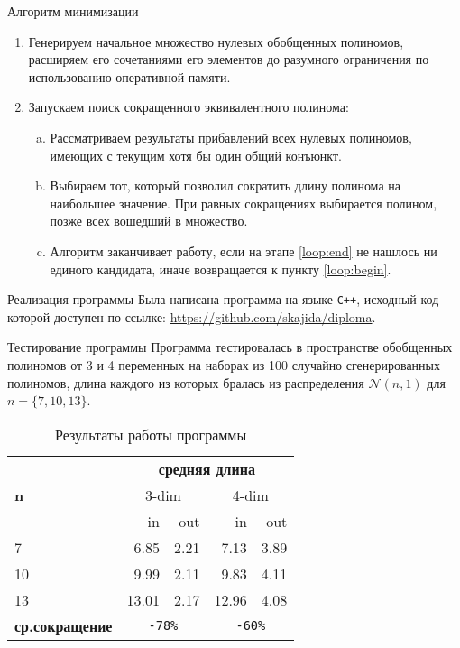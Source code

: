 \documentclass{beamer}
\begin{document}
\begin{frame}{Алгоритм минимизации}

\begin{enumerate}
    \item Генерируем начальное множество нулевых обобщенных полиномов, расширяем его сочетаниями его элементов до разумного ограничения по использованию оперативной памяти.
    \item Запускаем поиск сокращенного эквивалентного полинома:
    \begin{enumerate}[a.]
        \item \label{loop:begin} Рассматриваем результаты прибавлений всех нулевых полиномов, имеющих с текущим хотя бы один общий конъюнкт.
        \item \label{loop:end} Выбираем тот, который позволил сократить длину полинома на наибольшее значение. При равных сокращениях выбирается полином, позже всех вошедший в множество.
        \item Алгоритм заканчивает работу, если на этапе \ref{loop:end} не нашлось ни единого кандидата, иначе возвращается к пункту \ref{loop:begin}.
    \end{enumerate}
\end{enumerate}

\end{frame}

\begin{frame}{Реализация программы}
Была написана программа на языке \texttt{C++}, исходный код которой доступен по ссылке: \url{https://github.com/skajida/diploma}.
\end{frame}

\begin{frame}{Тестирование программы}
Программа тестировалась в пространстве обобщенных полиномов от 3 и 4 переменных на наборах из 100 случайно сгенерированных полиномов, длина каждого из которых бралась из распределения $ \mathcal{N} (n, 1) $ для $ n = \{ 7, 10, 13 \} $.

\begin{table}
\caption{Результаты работы программы}
\label{table_results}
\centering
\begin{tabular}{ |l||r|r||r|r| } \hline
\multirow{3}{*}{\bf n} & \multicolumn{4}{c|}{\bf средняя длина} \\ \cline{2-5}
    & \multicolumn{2}{c||}{3-dim} & \multicolumn{2}{c|}{4-dim} \\ \cline{2-5}
    & in    & out  & in    & out  \\ \hline \hline
7   & 6.85  & 2.21 & 7.13  & 3.89 \\ \hline
10  & 9.99  & 2.11 & 9.83  & 4.11 \\ \hline
13  & 13.01 & 2.17 & 12.96 & 4.08 \\ \hline \hline
\textbf{ср.сокращение} & \multicolumn{2}{c||}{\tt -78\%} & \multicolumn{2}{c|}{\tt -60\%} \\ \hline
\end{tabular}
\end{table}

\end{frame}
\end{document}
